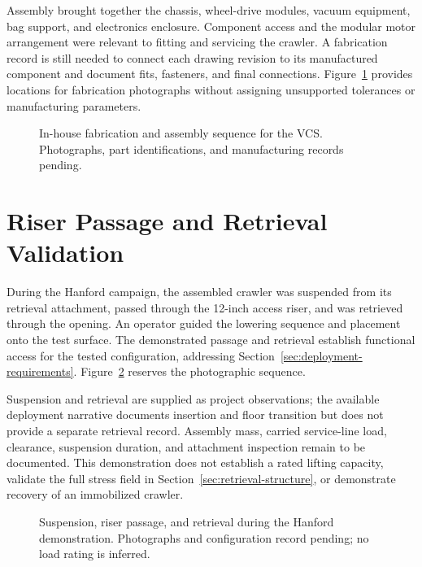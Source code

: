 Assembly brought together the chassis, wheel-drive modules, vacuum equipment, bag support, and electronics enclosure. Component access and the modular motor arrangement were relevant to fitting and servicing the crawler. A fabrication record is still needed to connect each drawing revision to its manufactured component and document fits, fasteners, and final connections. Figure~\ref{fig:validation-fabrication} provides locations for fabrication photographs without assigning unsupported tolerances or manufacturing parameters.

\begin{figure}[htbp]\centering
{}\hfill
{}\par\medskip
{}\hfill
{}
\caption{In-house fabrication and assembly sequence for the VCS. Photographs, part identifications, and manufacturing records pending.}
\label{fig:validation-fabrication}
\end{figure}

\section{Riser Passage and Retrieval Validation}
\label{sec:hanging-test}
During the Hanford campaign, the assembled crawler was suspended from its retrieval attachment, passed through the 12-inch access riser, and was retrieved through the opening. An operator guided the lowering sequence and placement onto the test surface. The demonstrated passage and retrieval establish functional access for the tested configuration, addressing Section~\ref{sec:deployment-requirements}. Figure~\ref{fig:validation-riser} reserves the photographic sequence.

Suspension and retrieval are supplied as project observations; the available deployment narrative documents insertion and floor transition but does not provide a separate retrieval record. Assembly mass, carried service-line load, clearance, suspension duration, and attachment inspection remain to be documented. This demonstration does not establish a rated lifting capacity, validate the full stress field in Section~\ref{sec:retrieval-structure}, or demonstrate recovery of an immobilized crawler.

\begin{figure}[htbp]\centering
{}\hfill
{}\par\medskip
{}
\caption{Suspension, riser passage, and retrieval during the Hanford demonstration. Photographs and configuration record pending; no load rating is inferred.}
\label{fig:validation-riser}
\end{figure}

